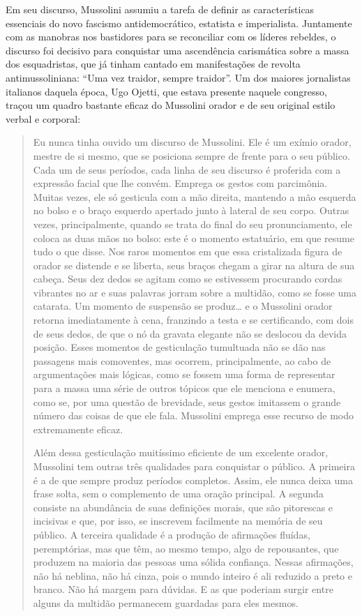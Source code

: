 Em seu discurso, Mussolini assumiu a tarefa de definir as
características essenciais do novo fascismo antidemocrático, estatista e
imperialista. Juntamente com as manobras nos bastidores para se
reconciliar com os líderes rebeldes, o discurso foi decisivo para
conquistar uma ascendência carismática sobre a massa dos esquadristas,
que já tinham cantado em manifestações de revolta antimussoliniana:
``Uma vez traidor, sempre traidor''. Um dos maiores jornalistas
italianos daquela época, Ugo Ojetti, que estava presente naquele
congresso, traçou um quadro bastante eficaz do Mussolini orador e de seu
original estilo verbal e corporal:

\begin{quote}
Eu nunca tinha ouvido um discurso de Mussolini. Ele é um exímio orador,
mestre de si mesmo, que se posiciona sempre de frente para o seu
público. Cada um de seus períodos, cada linha de seu discurso é
proferida com a expressão facial que lhe convém. Emprega os gestos com
parcimônia. Muitas vezes, ele só gesticula com a mão direita, mantendo a
mão esquerda no bolso e o braço esquerdo apertado junto à lateral de seu
corpo. Outras vezes, principalmente, quando se trata do final do seu
pronunciamento, ele coloca as duas mãos no bolso: este é o momento
estatuário, em que resume tudo o que disse. Nos raros momentos em que
essa cristalizada figura de orador se distende e se liberta, seus braços
chegam a girar na altura de sua cabeça. Seus dez dedos se agitam como se
estivessem procurando cordas vibrantes no ar e suas palavras jorram
sobre a multidão, como se fosse uma catarata. Um momento de suspensão se
produz\ldots{} e o Mussolini orador retorna imediatamente à cena, franzindo a
testa e se certificando, com dois de seus dedos, de que o nó da gravata
elegante não se deslocou da devida posição. Esses momentos de
gesticulação tumultuada não se dão nas passagens mais comoventes, mas
ocorrem, principalmente, ao cabo de argumentações mais lógicas, como se
fossem uma forma de representar para a massa uma série de outros tópicos
que ele menciona e enumera, como se, por uma questão de brevidade, seus
gestos imitassem o grande número das coisas de que ele fala. Mussolini
emprega esse recurso de modo extremamente eficaz.

Além dessa gesticulação muitíssimo eficiente de um excelente orador,
Mussolini tem outras três qualidades para conquistar o público. A
primeira é a de que sempre produz períodos completos. Assim, ele nunca
deixa uma frase solta, sem o complemento de uma oração principal. A
segunda consiste na abundância de suas definições morais, que são
pitorescas e incisivas e que, por isso, se inscrevem facilmente na
memória de seu público. A terceira qualidade é a produção de afirmações
fluídas, peremptórias, mas que têm, ao mesmo tempo, algo de repousantes,
que produzem na maioria das pessoas uma sólida confiança. Nessas
afirmações, não há neblina, não há cinza, pois o mundo inteiro é ali
reduzido a preto e branco. Não há margem para dúvidas. E as que poderiam
surgir entre alguns da multidão permanecem guardadas para eles mesmos.


\end{quote}
